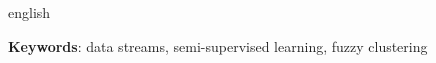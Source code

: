 \begin{resumo}[Abstract]
 \begin{otherlanguage*}{english}

   \vspace{\onelineskip}
 
   \noindent 
   \textbf{Keywords}: data streams, semi-supervised learning, fuzzy clustering
 \end{otherlanguage*}
\end{resumo}

